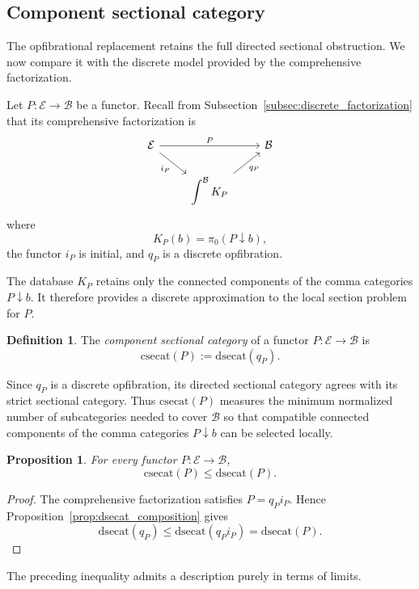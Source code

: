 \documentclass[12pt]{amsart}
\newtheorem{proposition}[teo]{Proposition}
\theoremstyle{definition}
\newtheorem{definition}[teo]{Definition}
\theoremstyle{remark}
\numberwithin{figure}{section}%
\newcommand{\Ba}{\mathcal{B}}
\newcommand{\E}{\mathcal{E}}
\begin{document}
\subsection{Component sectional category}\label{subsec:component_sectional}

The opfibrational replacement retains the full directed sectional
obstruction. We now compare it with the discrete model provided by the
comprehensive factorization.

Let \(P\colon\E\to\Ba\) be a functor. Recall from
Subsection~\ref{subsec:discrete_factorization} that its comprehensive
factorization is
\[
\begin{tikzcd}
\E
  \arrow[rr, "P"]
  \arrow[dr, "i_P"']
&&
\Ba
\\
&
\displaystyle\int^\Ba K_P
  \arrow[ur, "q_P"']
&
\end{tikzcd}
\]
where
\[
K_P(b)=\pi_0(P\downarrow b),
\]
the functor \(i_P\) is initial, and \(q_P\) is a discrete opfibration.

The database \(K_P\) retains only the connected components of the comma
categories \(P\downarrow b\). It therefore provides a discrete
approximation to the local section problem for \(P\).

\begin{definition}\label{def:component_sectional_category}
The \emph{component sectional category} of a functor
\(P\colon\E\to\Ba\) is
\[
\mathrm{csecat}(P)
:=
\mathrm{dsecat}(q_P).
\]
\end{definition}

Since \(q_P\) is a discrete opfibration, its directed sectional category
agrees with its strict sectional category. Thus
\(\mathrm{csecat}(P)\) measures the minimum normalized number of
subcategories needed to cover \(\Ba\) so that compatible connected
components of the comma categories \(P\downarrow b\) can be selected
locally.

\begin{proposition}\label{prop:csecat_lower_bound}
For every functor \(P\colon\E\to\Ba\),
\[
\mathrm{csecat}(P)
\leq
\mathrm{dsecat}(P).
\]
\end{proposition}

\begin{proof}
The comprehensive factorization satisfies \(P=q_Pi_P\). Hence
Proposition~\ref{prop:dsecat_composition} gives
\[
\mathrm{dsecat}(q_P)
\leq
\mathrm{dsecat}(q_Pi_P)
=
\mathrm{dsecat}(P).
\]
\end{proof}

The preceding inequality admits a description purely in terms of limits.
\end{document}
